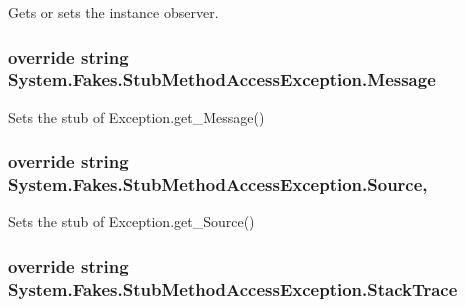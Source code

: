 Gets or sets the instance observer.

\hypertarget{class_system_1_1_fakes_1_1_stub_method_access_exception_aa3b48e6a57f1c27c079d5067a53cbf2e}{
\subsubsection[{Message}]{\setlength{\rightskip}{0pt plus 5cm}override string System.\-Fakes.\-Stub\-Method\-Access\-Exception.\-Message\hspace{0.3cm}{\ttfamily [get]}}}\label{class_system_1_1_fakes_1_1_stub_method_access_exception_aa3b48e6a57f1c27c079d5067a53cbf2e}


Sets the stub of Exception.\-get\-\_\-\-Message()

\hypertarget{class_system_1_1_fakes_1_1_stub_method_access_exception_a6946332820c256c8f50c166f5de31179}{
\subsubsection[{Source}]{\setlength{\rightskip}{0pt plus 5cm}override string System.\-Fakes.\-Stub\-Method\-Access\-Exception.\-Source\hspace{0.3cm}{\ttfamily [get]}, {\ttfamily [set]}}}\label{class_system_1_1_fakes_1_1_stub_method_access_exception_a6946332820c256c8f50c166f5de31179}


Sets the stub of Exception.\-get\-\_\-\-Source()

\hypertarget{class_system_1_1_fakes_1_1_stub_method_access_exception_a08797035dc6e96e20fe3fba9718ccec8}{
\subsubsection[{Stack\-Trace}]{\setlength{\rightskip}{0pt plus 5cm}override string System.\-Fakes.\-Stub\-Method\-Access\-Exception.\-Stack\-Trace\hspace{0.3cm}{\ttfamily [get]}}}\label{class_system_1_1_fakes_1_1_stub_method_access_exception_a08797035dc6e96e20fe3fba9718ccec8}


